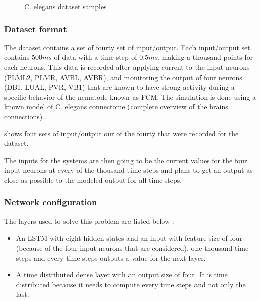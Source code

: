 \begin{figure}[H]
  \centering
  \begin{minipage}{\columnwidth}
    \hfill
  \end{minipage}
  \begin{minipage}{\columnwidth}
    \hfill
  \end{minipage}
  \caption{\ac{C. elegans} dataset samples}
  \label{graph:celegans}
\end{figure}

\subsubsection{Dataset format}

The dataset contains a set of fourty set of input/output. Each input/output set contains $500ms$ of data with a time step of $0.5ms$, making a thousand points for each neurons. This data is recorded after applying current to the input neurons (PLML2, PLMR, AVBL, AVBR), and monitoring the output of four neurons (DB1, LUAL, PVR, VB1) that are known to have strong activity during  a specific behavior of the nematode known as \ac{FCM}. The simulation is done using a known model of \ac{C. elegans} connectome (complete overview of the brains connections) \cite{celegans}.

 shows four sets of input/output our of the fourty that were recorded for the dataset.

The inputs for the systems are then going to be the current values for the four input neurons at every of the thousand time steps and plans to get an output as close as possible to the modeled output for all time steps.

\subsubsection{Network configuration}

The layers used to solve this problem are listed below :

\begin{itemize}
  \item An \ac{LSTM} with eight hidden states and an input with feature size of four (because of the four input neurons that are considered), one thousand time steps and every time steps outputs a value for the next layer.
  \item A time distributed dense layer with an output size of four. It is time distributed because it needs to compute every time steps and not only the last.
\end{itemize}

